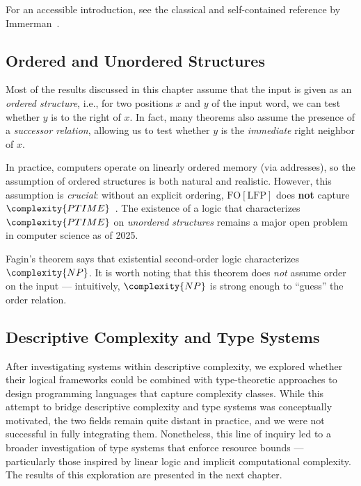 For an accessible introduction, see the classical and self-contained reference
by Immerman~\cite{Immerman1999-IMMDC}.

\subsection{Ordered and Unordered Structures}

Most of the results discussed in this chapter assume that the input is
given as an \emph{ordered structure}, i.e., for two positions \(x\) and \(y\)
of the input word, we can test whether \(y\) is to the right of \(x\).
In fact, many theorems also assume the presence of a \emph{successor relation},
allowing us to test whether \(y\) is the \emph{immediate} right neighbor of \(x\).

In practice, computers operate on linearly ordered memory
(via addresses), so the assumption of ordered structures is both natural
and realistic.
However, this assumption is \emph{crucial}:
without an explicit ordering, \(\mathrm{FO[LFP]}\) does \textbf{not} capture
\(\complexity{PTIME}\)~\cite{Cai1992}.
The existence of a logic that characterizes \(\complexity{PTIME}\) on
\emph{unordered structures} remains a major open problem in computer science as of 2025.

Fagin's theorem says that existential second-order logic characterizes
\(\complexity{NP}\).
It is worth noting that this theorem does \emph{not} assume order on the input ---
intuitively, \(\complexity{NP}\) is strong enough to ``guess'' the order relation.

\subsection{Descriptive Complexity and Type Systems}

After investigating systems within descriptive complexity, we explored
whether their logical frameworks could be combined with type-theoretic
approaches to design programming languages that capture complexity classes.
While this attempt to bridge descriptive complexity and type systems
was conceptually motivated, the two fields remain quite distant in practice,
and we were not successful in fully integrating them.
Nonetheless, this line of inquiry led to a broader investigation of
type systems that enforce resource bounds --- particularly those inspired
by linear logic and implicit computational complexity.
The results of this exploration are presented in the next chapter.

